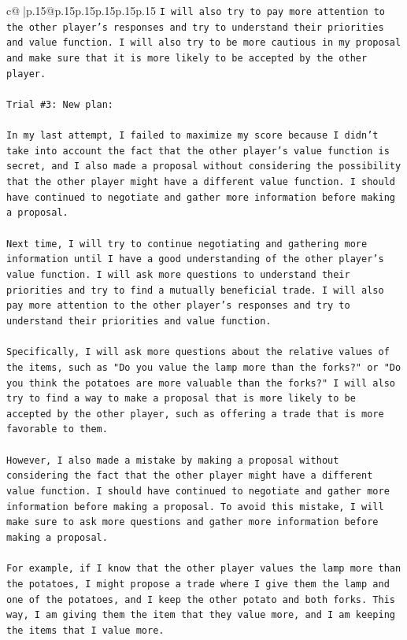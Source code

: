 \documentclass{article}
\begin{document}
{\begin{supertabular}{c@{$\;$}|p{.15\linewidth}@{}p{.15\linewidth}p{.15\linewidth}p{.15\linewidth}p{.15\linewidth}p{.15\linewidth}}
{{{\texttt{I will also try to pay more attention to the other player's responses and try to understand their priorities and value function. I will also try to be more cautious in my proposal and make sure that it is more likely to be accepted by the other player.} \\
\\ 
\texttt{Trial \#3: New plan: } \\
\\ 
\texttt{In my last attempt, I failed to maximize my score because I didn't take into account the fact that the other player's value function is secret, and I also made a proposal without considering the possibility that the other player might have a different value function. I should have continued to negotiate and gather more information before making a proposal.} \\
\\ 
\texttt{Next time, I will try to continue negotiating and gathering more information until I have a good understanding of the other player's value function. I will ask more questions to understand their priorities and try to find a mutually beneficial trade. I will also pay more attention to the other player's responses and try to understand their priorities and value function.} \\
\\ 
\texttt{Specifically, I will ask more questions about the relative values of the items, such as "Do you value the lamp more than the forks?" or "Do you think the potatoes are more valuable than the forks?" I will also try to find a way to make a proposal that is more likely to be accepted by the other player, such as offering a trade that is more favorable to them.} \\
\\ 
\texttt{However, I also made a mistake by making a proposal without considering the fact that the other player might have a different value function. I should have continued to negotiate and gather more information before making a proposal. To avoid this mistake, I will make sure to ask more questions and gather more information before making a proposal.} \\
\\ 
\texttt{For example, if I know that the other player values the lamp more than the potatoes, I might propose a trade where I give them the lamp and one of the potatoes, and I keep the other potato and both forks. This way, I am giving them the item that they value more, and I am keeping the items that I value more.} \\
}}}
\end{supertabular}}
\end{document}
